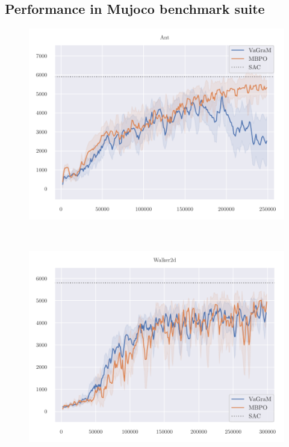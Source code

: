 \subsection{Performance in Mujoco benchmark suite}
\begin{figure}[t]
\begin{center}
\begin{minipage}{.49\textwidth}
    \centering
    \includegraphics[width=\textwidth]{figures/vagram/ant_nonorm.pdf}
\end{minipage}~
\begin{minipage}{.49\textwidth}
    \centering
    \includegraphics[width=\textwidth]{figures/vagram/walker_nonorm.pdf}
\end{minipage}
\end{center}


\end{figure}
